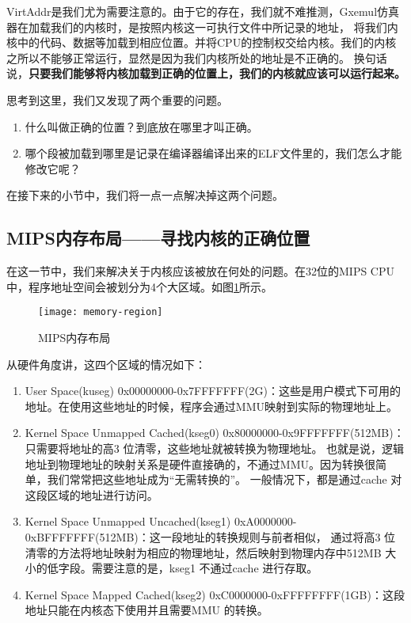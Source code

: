 VirtAddr是我们尤为需要注意的。由于它的存在，我们就不难推测，Gxemul仿真器在加载我们的内核时，是按照内核这一可执行文件中所记录的地址，
将我们内核中的代码、数据等加载到相应位置。并将CPU的控制权交给内核。我们的内核之所以不能够正常运行，显然是因为我们内核所处的地址是不正确的。
换句话说，\textbf{只要我们能够将内核加载到正确的位置上，我们的内核就应该可以运行起来。}

思考到这里，我们又发现了两个重要的问题。
\begin{enumerate}
  \item 什么叫做正确的位置？到底放在哪里才叫正确。
  \item 哪个段被加载到哪里是记录在编译器编译出来的ELF文件里的，我们怎么才能修改它呢？
\end{enumerate}
在接下来的小节中，我们将一点一点解决掉这两个问题。

\subsection{MIPS内存布局——寻找内核的正确位置}
在这一节中，我们来解决关于内核应该被放在何处的问题。在32位的MIPS CPU中，程序地址空间会被划分为4个大区域。如图\ref{fig:memory-region}所示。

\begin{figure}[htbp]
  \centering
  \texttt{[image: memory-region]}
  \caption{MIPS内存布局}\label{fig:memory-region} 
\end{figure}

从硬件角度讲，这四个区域的情况如下：

\begin{enumerate}
  \item User Space(kuseg) 0x00000000-0x7FFFFFFF(2G)：这些是用户模式下可用的地址。在使用这些地址的时候，程序会通过MMU映射到实际的物理地址上。
  \item Kernel Space Unmapped Cached(kseg0) 0x80000000-0x9FFFFFFF(512MB)：只需要将地址的高3 位清零，这些地址就被转换为物理地址。
也就是说，逻辑地址到物理地址的映射关系是硬件直接确的，不通过MMU。因为转换很简单，我们常常把这些地址成为“无需转换的”。
一般情况下，都是通过cache 对这段区域的地址进行访问。
  \item Kernel Space Unmapped Uncached(kseg1) 0xA0000000-0xBFFFFFFF(512MB)：这一段地址的转换规则与前者相似，
通过将高3 位清零的方法将地址映射为相应的物理地址，然后映射到物理内存中512MB 大小的低字段。需要注意的是，kseg1 不通过cache 进行存取。
  \item Kernel Space Mapped Cached(kseg2) 0xC0000000-0xFFFFFFFF(1GB)：这段地址只能在内核态下使用并且需要MMU 的转换。
\end{enumerate}

